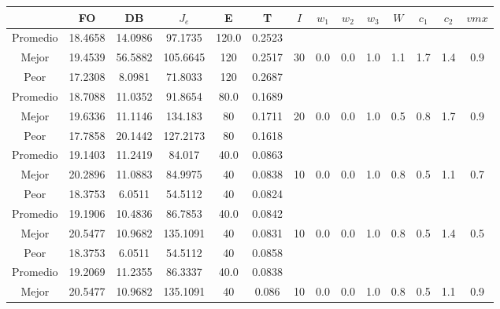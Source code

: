\begin{table}[h!]
    \footnotesize
    \begin{center}
        \begin{tabular}{|c|c|c|c|c|c|c|c|c|c|c|c|c|c|}
        \hline
            & {\bf FO} & {\bf DB} & $J_e$ & {\bf E} & {\bf T} & $I$ & $w_1$ & $w_2$ & $w_3$ & $W$ & $c_1$ & $c_2$ & $vmx$ \\
        \hline
        \hline
            Promedio  & 18.4658 & 14.0986 & 97.1735 & 120.0 & 0.2523 &  &  &  &  &  &  &  & \\
            \cline{1-6}
            Mejor & 19.4539 & 56.5882  & 105.6645 & 120 & 0.2517 & 30 & 0.0 & 0.0 & 1.0 & 1.1 & 1.7 & 1.4 & 0.9\\
            \cline{1-6}
            Peor & 17.2308 & 8.0981  & 71.8033 & 120 & 0.2687 &  &  &  &  &  &  &  & \\
        \hline
        \hline
            Promedio  & 18.7088 & 11.0352 & 91.8654 & 80.0 & 0.1689 &  &  &  &  &  &  &  & \\
            \cline{1-6}
            Mejor & 19.6336 & 11.1146  & 134.183 & 80 & 0.1711 & 20 & 0.0 & 0.0 & 1.0 & 0.5 & 0.8 & 1.7 & 0.9\\
            \cline{1-6}
            Peor & 17.7858 & 20.1442  & 127.2173 & 80 & 0.1618 &  &  &  &  &  &  &  & \\
        \hline
        \hline
            Promedio  & 19.1403 & 11.2419 & 84.017 & 40.0 & 0.0863 &  &  &  &  &  &  &  & \\
            \cline{1-6}
            Mejor & 20.2896 & 11.0883  & 84.9975 & 40 & 0.0838 & 10 & 0.0 & 0.0 & 1.0 & 0.8 & 0.5 & 1.1 & 0.7\\
            \cline{1-6}
            Peor & 18.3753 & 6.0511  & 54.5112 & 40 & 0.0824 &  &  &  &  &  &  &  & \\
        \hline
        \hline
            Promedio  & 19.1906 & 10.4836 & 86.7853 & 40.0 & 0.0842 &  &  &  &  &  &  &  & \\
            \cline{1-6}
            Mejor & 20.5477 & 10.9682  & 135.1091 & 40 & 0.0831 & 10 & 0.0 & 0.0 & 1.0 & 0.8 & 0.5 & 1.4 & 0.5\\
            \cline{1-6}
            Peor & 18.3753 & 6.0511  & 54.5112 & 40 & 0.0858 &  &  &  &  &  &  &  & \\
        \hline
        \hline
            Promedio  & 19.2069 & 11.2355 & 86.3337 & 40.0 & 0.0838 &  &  &  &  &  &  &  & \\
            \cline{1-6}
            Mejor & 20.5477 & 10.9682  & 135.1091 & 40 & 0.086 & 10 & 0.0 & 0.0 & 1.0 & 0.8 & 0.5 & 1.1 & 0.9\\

\end{tabular}
\end{center}
\end{table}
